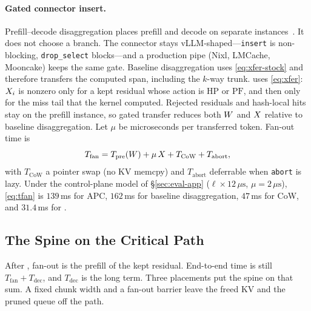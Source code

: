 \paragraph{Gated connector insert.}
Prefill--decode disaggregation places prefill and decode on separate instances~\cite{distserve,splitwise}.
It does not choose a branch.
The connector stays vLLM-shaped---\texttt{insert} is non-blocking, \texttt{drop\_select} blocks---and a production pipe (Nixl, LMCache, Mooncake) keeps the same gate.
Baseline disaggregation uses \eqref{eq:xfer-stock} and therefore transfers the computed span, including the $k$-way trunk.
\app uses \eqref{eq:xfer}: $X_i$ is nonzero only for a kept residual whose action is $\mathrm{HP}$ or $\mathrm{PF}$, and then only for the miss tail that the kernel computed.
Rejected residuals and hash-local hits stay on the prefill instance, so gated transfer reduces both $W$ and $X$ relative to baseline disaggregation.
Let $\mu$ be microseconds per transferred token.
Fan-out time is
\begin{equation}
\label{eq:tfan}
T_{\mathrm{fan}}=T_{\mathrm{pre}}(W)+\mu\,X+T_{\mathrm{CoW}}+T_{\mathrm{abort}},
\end{equation}
with $T_{\mathrm{CoW}}$ a pointer swap (no KV memcpy) and $T_{\mathrm{abort}}$ deferrable when \texttt{abort} is lazy.
Under the control-plane model of \S\ref{sec:eval-app} ($\ell{\times}12\,\mu\mathrm{s}$, $\mu{=}2\,\mu\mathrm{s}$), \eqref{eq:tfan} is $139$\,ms for APC, $162$\,ms for baseline disaggregation, $47$\,ms for CoW, and $31.4$\,ms for \app.

\subsection{The Spine on the Critical Path}
\label{sec:schedule}
After \app, fan-out is the prefill of the kept residual.
End-to-end time is still $T_{\mathrm{fan}}+T_{\mathrm{dec}}$, and $T_{\mathrm{dec}}$ is the long term.
Three placements put the spine on that sum.
A fixed chunk width and a fan-out barrier leave the freed KV and the pruned queue off the path.

